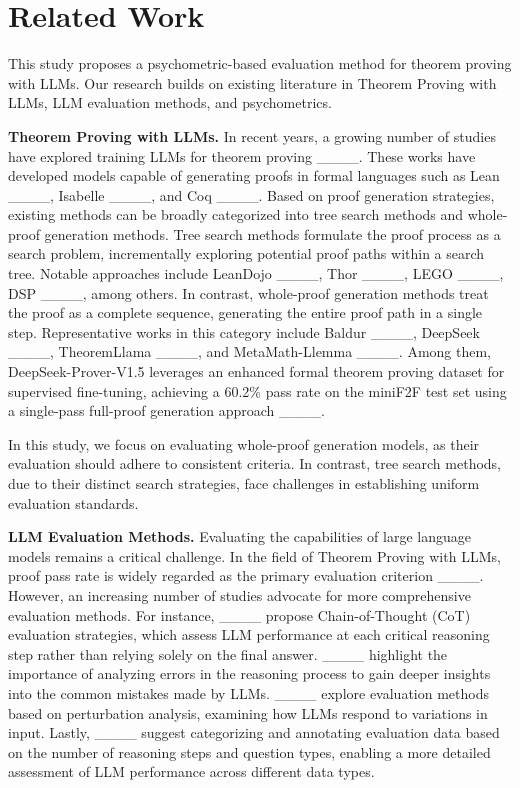 \section{Related Work}
\label{section-2}
This study proposes a psychometric-based evaluation method for theorem proving with LLMs. Our research builds on existing literature in Theorem Proving with LLMs, LLM evaluation methods, and psychometrics.

\textbf{Theorem Proving with LLMs.} In recent years, a growing number of studies have explored training LLMs for theorem proving ____. These works have developed models capable of generating proofs in formal languages such as Lean ____, Isabelle ____, and Coq ____. Based on proof generation strategies, existing methods can be broadly categorized into tree search methods and whole-proof generation methods. Tree search methods formulate the proof process as a search problem, incrementally exploring potential proof paths within a search tree. Notable approaches include LeanDojo ____, Thor ____, LEGO ____, DSP ____, among others. In contrast, whole-proof generation methods treat the proof as a complete sequence, generating the entire proof path in a single step. Representative works in this category include Baldur ____, DeepSeek ____, TheoremLlama ____, and MetaMath-Llemma ____. Among them, DeepSeek-Prover-V1.5 leverages an enhanced formal theorem proving dataset for supervised fine-tuning, achieving a 60.2\% pass rate on the miniF2F test set using a single-pass full-proof generation approach ____.

In this study, we focus on evaluating whole-proof generation models, as their evaluation should adhere to consistent criteria. In contrast, tree search methods, due to their distinct search strategies, face challenges in establishing uniform evaluation standards.

\textbf{LLM Evaluation Methods.} Evaluating the capabilities of large language models remains a critical challenge. In the field of Theorem Proving with LLMs, proof pass rate is widely regarded as the primary evaluation criterion ____. However, an increasing number of studies advocate for more comprehensive evaluation methods. For instance, ____ propose Chain-of-Thought (CoT) evaluation strategies, which assess LLM performance at each critical reasoning step rather than relying solely on the final answer. ____ highlight the importance of analyzing errors in the reasoning process to gain deeper insights into the common mistakes made by LLMs. ____ explore evaluation methods based on perturbation analysis, examining how LLMs respond to variations in input. Lastly, ____ suggest categorizing and annotating evaluation data based on the number of reasoning steps and question types, enabling a more detailed assessment of LLM performance across different data types.

